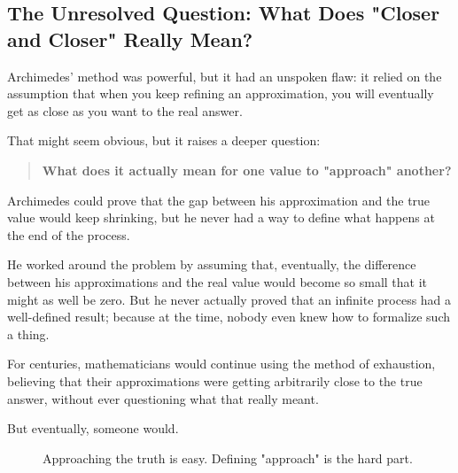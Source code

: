 \subsection{The Unresolved Question: What Does "Closer and Closer" Really Mean?}  

Archimedes’ method was powerful, but it had an unspoken flaw: it relied on the assumption that when you keep refining an approximation, you will eventually get as close as you want to the real answer.  

That might seem obvious, but it raises a deeper question:  

\begin{quote}
    \textbf{What does it actually mean for one value to "approach" another?}
\end{quote}

Archimedes could prove that the gap between his approximation and the true value would keep shrinking, but he never had a way to define what happens at the end of the process.  

He worked around the problem by assuming that, eventually, the difference between his approximations and the real value would become so small that it might as well be zero. But he never actually proved that an infinite process had a well-defined result; because at the time, nobody even knew how to formalize such a thing.  

For centuries, mathematicians would continue using the method of exhaustion, believing that their approximations were getting arbitrarily close to the true answer, without ever questioning what that really meant.  

But eventually, someone would.  





\begin{figure}[H]
\centering
{}
\caption{Approaching the truth is easy. Defining "approach" is the hard part.}
\end{figure}
